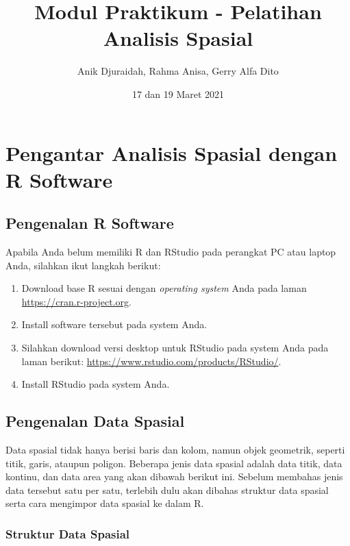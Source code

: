 \documentclass[
]{book}
\title{Modul Praktikum - Pelatihan Analisis Spasial}
\author{Anik Djuraidah, Rahma Anisa, Gerry Alfa Dito}
\date{17 dan 19 Maret 2021}
\begin{document}
\maketitle

{
\setcounter{tocdepth}{1}
\tableofcontents
}
\hypertarget{pengantar-analisis-spasial-dengan-r-software}{%
\chapter{Pengantar Analisis Spasial dengan R Software}\label{pengantar-analisis-spasial-dengan-r-software}}

\hypertarget{pengenalan-r-software}{%
\section{Pengenalan R Software}\label{pengenalan-r-software}}

Apabila Anda belum memiliki R dan RStudio pada perangkat PC atau laptop Anda, silahkan ikut langkah berikut:

\begin{enumerate}
\def\labelenumi{\arabic{enumi}.}
\item
  Download base R sesuai dengan \emph{operating system} Anda pada laman \url{https://cran.r-project.org}.
\item
  Install software tersebut pada system Anda.
\item
  Silahkan download versi desktop untuk RStudio pada system Anda pada laman berikut: \url{https://www.rstudio.com/products/RStudio/}.
\item
  Install RStudio pada system Anda.
\end{enumerate}

\hypertarget{pengenalan-data-spasial}{%
\section{Pengenalan Data Spasial}\label{pengenalan-data-spasial}}

Data spasial tidak hanya berisi baris dan kolom, namun objek geometrik, seperti titik, garis, ataupun poligon. Beberapa jenis data spasial adalah data titik, data kontinu, dan data area yang akan dibawah berikut ini. Sebelum membahas jenis data tersebut satu per satu, terlebih dulu akan dibahas struktur data spasial serta cara mengimpor data spasial ke dalam R.

\hypertarget{struktur-data-spasial}{%
\subsection{Struktur Data Spasial}\label{struktur-data-spasial}}
\end{document}
